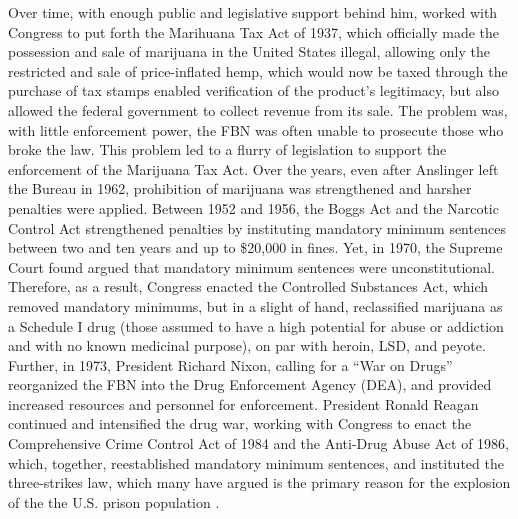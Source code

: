 Over time, with enough public and legislative support behind him, worked with Congress to put forth the Marihuana Tax Act of 1937, which officially made the possession and sale of marijuana in the United States illegal, allowing only the restricted and sale of price-inflated hemp, which would now be taxed through the purchase of tax stamps enabled verification of the product's legitimacy, but also allowed the federal government to collect revenue from its sale. The problem was, with little enforcement power, the FBN was often unable to prosecute those who broke the law. This problem led to a flurry of legislation to support the enforcement of the Marijuana Tax Act. Over the years, even after Anslinger left the Bureau in 1962, prohibition of marijuana was strengthened and harsher penalties were applied. Between 1952 and 1956, the Boggs Act and the Narcotic Control Act strengthened penalties by instituting mandatory minimum sentences between two and ten years and up to \$20,000 in fines. Yet, in 1970, the Supreme Court found argued that mandatory minimum sentences were unconstitutional. Therefore, as a result, Congress enacted the Controlled Substances Act, which removed mandatory minimums, but in a slight of hand, reclassified marijuana as a Schedule I drug (those assumed to have a high potential for abuse or addiction and with no known medicinal purpose), on par with heroin, LSD, and peyote. Further, in 1973, President Richard Nixon, calling for a ``War on Drugs'' reorganized the FBN into the Drug Enforcement Agency (DEA), and provided increased resources and personnel for enforcement. President Ronald Reagan continued and intensified the drug war, working with Congress to enact the Comprehensive Crime Control Act of 1984 and the Anti-Drug Abuse Act of 1986, which, together, reestablished mandatory minimum sentences, and instituted the three-strikes law, which many have argued is the primary reason for the explosion of the the U.S. prison population \citep{alexander_2010}.

